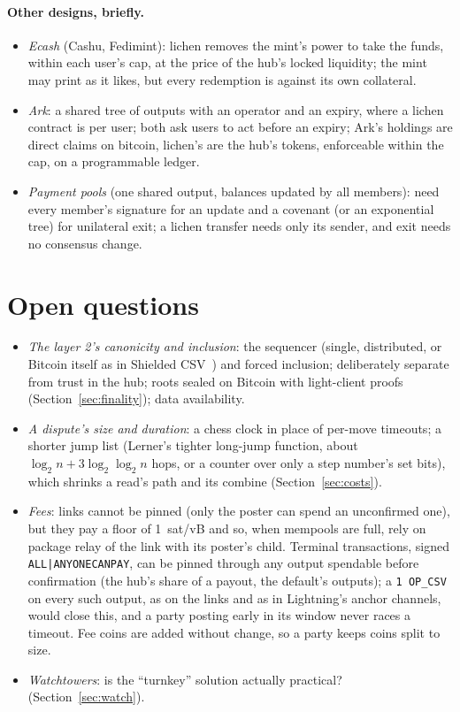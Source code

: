 \documentclass[11pt]{article}
\begin{document}
\paragraph{Other designs, briefly.}
\begin{itemize}[leftmargin=1.5em]
\item \emph{Ecash} (Cashu, Fedimint): lichen removes the mint's power to
  take the funds, within each user's cap, at the price of the hub's
  locked liquidity; the mint may print as it likes, but every redemption
  is against its own collateral.
\item \emph{Ark}: a shared tree of outputs with an operator and an
  expiry, where a lichen contract is per user; both ask users to act
  before an expiry; Ark's holdings are direct claims on bitcoin, lichen's
  are the hub's tokens, enforceable within the cap, on a programmable
  ledger.
\item \emph{Payment pools} (one shared output, balances updated by all
  members): need every member's signature for an update and a covenant
  (or an exponential tree) for unilateral exit; a lichen transfer needs
  only its sender, and exit needs no consensus change.
\end{itemize}

\section{Open questions}
\label{sec:open}

\begin{itemize}[leftmargin=1.5em]
\item \emph{The layer 2's canonicity and inclusion}: the sequencer
  (single, distributed, or Bitcoin itself as in Shielded
  CSV~\cite{shieldedcsv}) and forced inclusion; deliberately separate from
  trust in the hub; roots sealed on Bitcoin with light-client proofs
  (Section~\ref{sec:finality}); data availability.
\item \emph{A dispute's size and duration}: a chess clock in place of
  per-move timeouts; a shorter jump list (Lerner's tighter long-jump
  function, about $\log_2 n + 3\log_2\log_2 n$ hops, or a counter over
  only a step number's set bits), which shrinks a read's path and its
  combine (Section~\ref{sec:costs}).
\item \emph{Fees}: links cannot be pinned (only the poster can spend
  an unconfirmed one), but they pay a floor of 1~sat/vB and so, when
  mempools are full, rely on package relay of the link with its
  poster's child. Terminal transactions, signed
  \texttt{ALL|ANYONECANPAY}, can be pinned through any output spendable
  before confirmation (the hub's share of a payout, the default's
  outputs); a \texttt{1 OP\_CSV} on every such output, as on the links
  and as in Lightning's anchor channels, would close this, and a party
  posting early in its window never races a timeout. Fee coins are
  added without change, so a party keeps coins split to size.
\item \emph{Watchtowers}: is the ``turnkey'' solution actually practical?
  (Section~\ref{sec:watch}).
\end{itemize}
\end{document}
